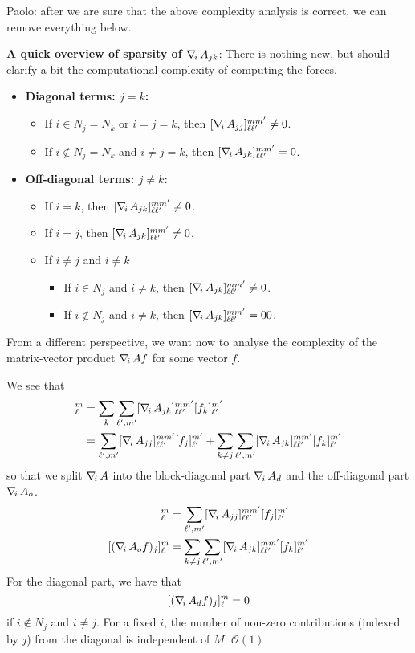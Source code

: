 {\color{red} Paolo: after we are sure that the above complexity analysis is correct, we can remove everything below.}

\noindent
{\bf A quick overview of sparsity of $\nabla_{\!i}\, A_{jk}$}: There is nothing new, but should clarify a bit the computational complexity of computing the forces.
\begin{itemize}
\item {\bf Diagonal terms: $j=k$:}
	\begin{itemize}
		\item If $i\in N_j=N_k$ or $i=j=k$, then $[ \nabla_{\!i}\, A_{jj}]_{\ell \ell'}^{m m'} \neq 0$. 
		\item If $i\not \in N_j=N_k$ and  $i\neq j=k$, then $[ \nabla_{\!i}\, A_{jk}]_{\ell \ell'}^{m m'} = 0$.
	\end{itemize}
\item {\bf Off-diagonal terms: $j\neq k$:}
	\begin{itemize}
		\item If $i=k$, then $[ \nabla_{\!i}\, A_{jk}]_{\ell \ell'}^{m m'} \neq 0$.
		\item If $i=j$, then $[ \nabla_{\!i}\, A_{jk}]_{\ell \ell'}^{m m'} \neq 0$.
		\item If $i\neq j$ and $i\neq k$
		\begin{itemize}
			\item If $i\in N_j$ and $i\neq k$, then $[ \nabla_{\!i}\, A_{jk}]_{\ell \ell'}^{m m'} \neq 0$.
			\item If $i\not\in N_j$ and $i\neq k$, then $[ \nabla_{\!i}\, A_{jk}]_{\ell \ell'}^{m m'} =0 0$.
		\end{itemize}
	\end{itemize}
\end{itemize}
From a different perspective, we want now to analyse the complexity of the matrix-vector product $\nabla_{\!i}\, A f$ for some vector $f$.
%

We see that 
\begin{align*}
	[(\nablai A f)_j]_\ell^m 
	&= \sum_k \sum_{\ell',m'} [\nablai A_{jk}]_{\ell \ell'}^{m m'} [f_k]_{\ell'}^{m'} \\
	&= \sum_{\ell',m'} [\nablai A_{jj}]_{\ell \ell'}^{m m'} [f_j]_{\ell'}^{m'} 
	+ \sum_{k\neq j} \sum_{\ell',m'} [\nablai A_{jk}]_{\ell \ell'}^{m m'} [f_k]_{\ell'}^{m'} 
\end{align*}
so that we split $\nabla_{\!i}\, A$ into the block-diagonal part $\nabla_{\!i}\, A_d$ and the off-diagonal part $\nabla_{\!i}\, A_o$.
\begin{align*}
	[(\nablai A_d f)_j]_\ell^m 
	&= \sum_{\ell',m'} [\nablai A_{jj}]_{\ell \ell'}^{m m'} [f_j]_{\ell'}^{m'} \\
	[(\nablai A_o f)_j]_\ell^m 
	&= \sum_{k\neq j} \sum_{\ell',m'} [\nablai A_{jk}]_{\ell \ell'}^{m m'} [f_k]_{\ell'}^{m'} 
\end{align*}
For the diagonal part, we have that
\[
	[(\nabla_{\!i}\, A_d f)_j]_\ell^m = 0
\]
if $i\not\in N_j$ and $i\neq j$. For a fixed $i$, the number of non-zero contributions (indexed by $j$) from the diagonal is independent of $M$. $\mathcal O(1)$

